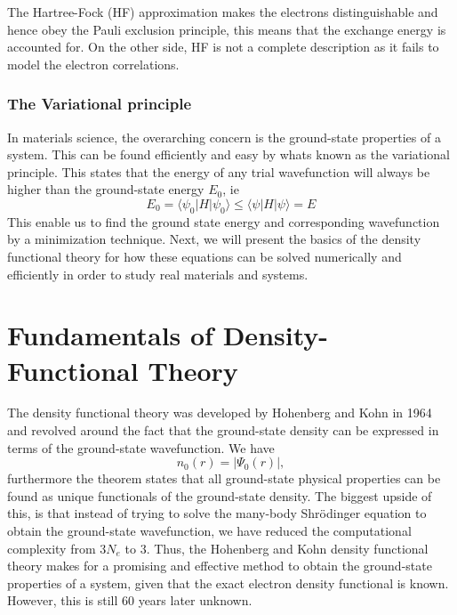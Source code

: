 The Hartree-Fock (HF) approximation makes the electrons distinguishable and hence obey the Pauli exclusion principle, this means that the exchange energy is accounted for. On the other side, HF is not a complete description as it fails to model the electron correlations. 

\subsubsection{The Variational principle}
In materials science, the overarching concern is the ground-state properties of a system. This can be found efficiently and easy by whats known as the variational principle. This states that the energy of any trial wavefunction will always be higher than the ground-state energy $E_0$, ie
\begin{equation}
    E_0 = \langle\psi_0|H|\psi_0\rangle \leq \langle\psi|H|\psi\rangle = E
\end{equation}
This enable us to find the ground state energy and corresponding wavefunction by a minimization technique. Next, we will present the basics of the density functional theory for how these equations can be solved numerically and efficiently in order to study real materials and systems.

\section{Fundamentals of Density-Functional Theory}
The density functional theory was developed by Hohenberg and Kohn in 1964 and revolved around the fact that the ground-state density can be expressed in terms of the ground-state wavefunction. We have
\begin{equation}
    n_0(r) = |\Psi_0(r)|,
\end{equation}
furthermore the theorem states that all ground-state physical properties can be found as unique functionals of the ground-state density. The biggest upside of this, is that instead of trying to solve the many-body Shr\"{o}dinger equation to obtain the ground-state wavefunction, we have reduced the computational complexity from $3N_e$ to $3$. Thus, the Hohenberg and Kohn density functional theory makes for a promising and effective method to obtain the ground-state properties of a system, given that the exact electron density functional is known. However, this is still 60 years later unknown. 

